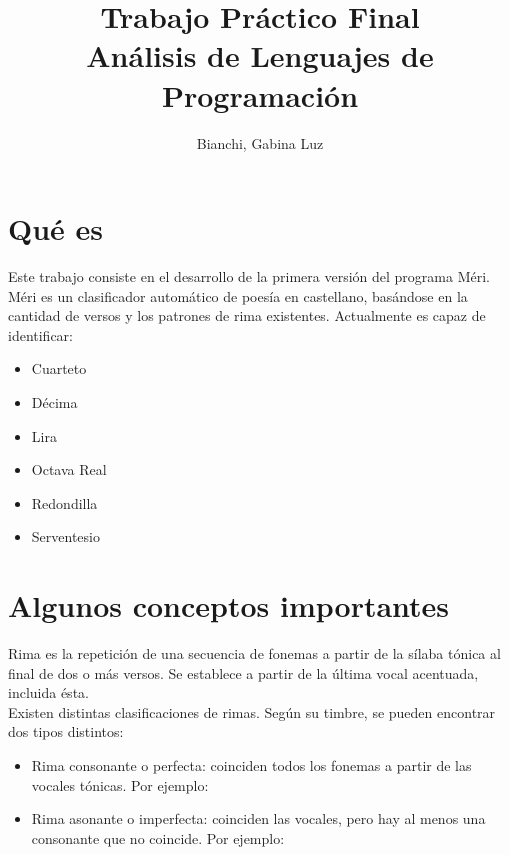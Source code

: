 \documentclass[12pt, a4paper]{article}
\begin{document}
 
\title{Trabajo Práctico Final\\ Análisis de Lenguajes de Programación} 
\author{Bianchi, Gabina Luz} 
\maketitle

\section*{Qué es}
Este trabajo consiste en el desarrollo de la primera versión del programa Méri. Méri es un clasificador automático de poesía en castellano, basándose en la cantidad de versos y los patrones de rima existentes. Actualmente es capaz de identificar:
\begin{itemize}
	\item Cuarteto
	\item Décima
	\item Lira
	\item Octava Real
	\item Redondilla
	\item Serventesio	
\end{itemize}

\section*{Algunos conceptos importantes}
Rima es la repetición de una secuencia de fonemas a partir de la sílaba tónica al final de dos o más versos. Se establece a partir de la última vocal acentuada, incluida ésta.\\
Existen distintas clasificaciones de rimas. Según su timbre, se pueden encontrar dos tipos distintos:
\begin{itemize}
	\item Rima consonante o perfecta: coinciden todos los fonemas a partir de las vocales tónicas. Por ejemplo:
	
	\medskip
	
	\item Rima asonante o imperfecta: coinciden las vocales, pero hay al menos una consonante que no coincide. Por ejemplo:
	
	\medskip
	
\end{itemize}
\end{document}
